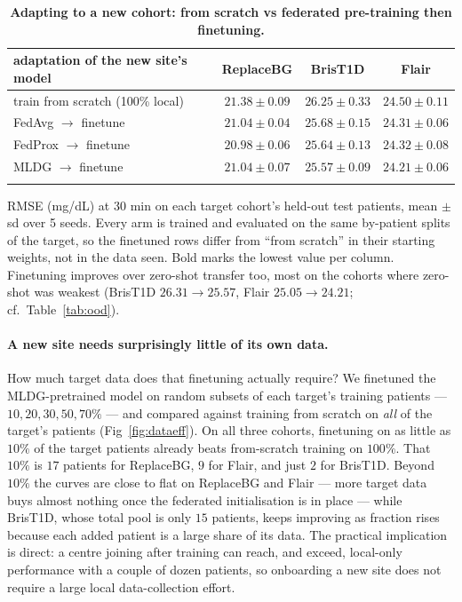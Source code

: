 \documentclass[10pt,letterpaper]{article}
\newlength\savedwidth
\newcommand\thickhline{\noalign{\global\savedwidth\arrayrulewidth\global\arrayrulewidth 2pt}%
\hline
\noalign{\global\arrayrulewidth\savedwidth}}
\begin{document}
\begin{table}[!ht]
\centering
\captionsetup{justification=centering,singlelinecheck=on}
\caption{\bf Adapting to a new cohort: from scratch vs federated pre-training then finetuning.}
\label{tab:finetune}
\begin{tabular}{lccc}
\thickhline
adaptation of the new site's model & ReplaceBG & BrisT1D & Flair \\
\hline
train from scratch (100\% local) & $21.38 \pm 0.09$ & $26.25 \pm 0.33$ & $24.50 \pm 0.11$ \\
\hline
FedAvg $\rightarrow$ finetune  & $21.04 \pm 0.04$ & $25.68 \pm 0.15$ & $24.31 \pm 0.06$ \\
FedProx $\rightarrow$ finetune & $\mathbf{20.98 \pm 0.06}$ & $25.64 \pm 0.13$ & $24.32 \pm 0.08$ \\
MLDG $\rightarrow$ finetune    & $21.04 \pm 0.07$ & $\mathbf{25.57 \pm 0.09}$ & $\mathbf{24.21 \pm 0.06}$ \\
\thickhline
\end{tabular}
\begin{center}
{\small RMSE (mg/dL) at 30 min on each target cohort's held-out test patients,
mean $\pm$ sd over 5 seeds. Every arm is trained and evaluated on the same
by-patient splits of the target, so the finetuned rows differ from ``from
scratch'' in their starting weights, not in the data seen. Bold marks the lowest value per
column. Finetuning improves over zero-shot transfer too, most on the cohorts where
zero-shot was weakest (BrisT1D $26.31\rightarrow25.57$, Flair
$25.05\rightarrow24.21$; cf.\ Table~\ref{tab:ood}).}
\end{center}
\end{table}

\paragraph{A new site needs surprisingly little of its own data.} How much
target data does that finetuning actually require? We finetuned the
MLDG-pretrained model on random subsets of each target's training patients ---
$10, 20, 30, 50, 70\%$ --- and compared against training from scratch on
\emph{all} of the target's patients (Fig~\ref{fig:dataeff}). On all three cohorts,
finetuning on as little as $10\%$ of the target patients already beats
from-scratch training on $100\%$. That $10\%$ is $17$ patients for ReplaceBG,
$9$ for Flair, and just $2$ for BrisT1D.
Beyond $10\%$ the curves are close to flat on ReplaceBG and Flair --- more target
data buys almost nothing once the federated initialisation is in place --- while
BrisT1D, whose total pool is only $15$ patients, keeps improving as fraction rises
because each added patient is a large share of its data. The practical implication
is direct: a centre joining after training can reach, and exceed, local-only
performance with a couple of dozen patients, so onboarding a new site does not
require a large local data-collection effort.
\end{document}
